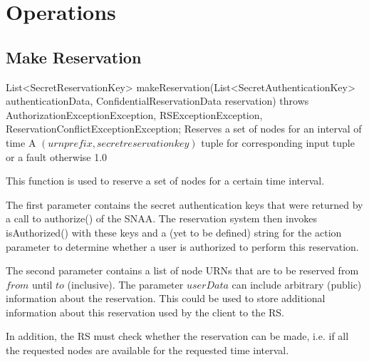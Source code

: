 \documentclass[a4paper,11pt]{article}
\begin{document}
\FloatBarrier

	\sectionfin
	\section{Operations}
	\label{sec:operations}

			\sectionfin
			\subsection{Make Reservation}
	
\begin{apidoc}
	{List<SecretReservationKey> makeReservation(List<SecretAuthenticationKey> authenticationData, ConfidentialReservationData reservation) throws AuthorizationExceptionException, RSExceptionException, ReservationConflictExceptionException;} %
	{Reserves a set of nodes for an interval of time} %
	{
	} %
	{A $(urnprefix, secretreservationkey)$ tuple for corresponding input tuple or a fault otherwise} %
	{} %
	{1.0} %
\end{apidoc}

This function is used to reserve a set of nodes for a certain time interval. 

The first parameter contains the secret authentication keys that were returned by a call to authorize() of the SNAA. The reservation system then invokes isAuthorized() with these keys and a (yet to be defined) string for the action parameter to determine whether a user is authorized to perform this reservation. 

The second parameter contains a list of node URNs that are to be reserved from $from$ until $to$ (inclusive). The parameter $userData$ can include arbitrary (public) information about the reservation. This could be used to store additional information about this reservation used by the client to the RS.

In addition, the RS must check whether the reservation can be made, i.e. if all the requested nodes are available for the requested time interval. 
\end{document}

